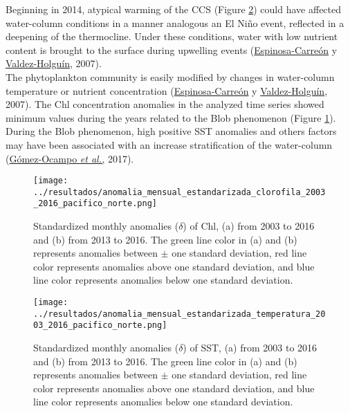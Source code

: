 \documentclass{article} %
\begin{document}
Beginning in 2014, atypical warming of the CCS (Figure \ref{fig:anomalies_sst}) could have affected water-column conditions in a manner analogous an El Niño event, reflected in a deepening of the thermocline. Under these conditions, water with low nutrient content is brought to the surface during upwelling events (\hyperlink{espinosa}{Espinosa-Carreón} y \hyperlink{espinosa}{Valdez-Holguín}, 2007).\\

The phytoplankton community is easily modified by changes in water-column temperature or nutrient concentration (\hyperlink{espinosa}{Espinosa-Carreón} y \hyperlink{espinosa}{Valdez-Holguín}, 2007). The Chl concentration anomalies in the analyzed time series showed minimum values during the years related to the Blob phenomenon (Figure \ref{fig:anomalies_chl}). During the Blob phenomenon, high positive SST anomalies and others factors may have been associated with an increase stratification of the water-column (\hyperlink{gomez}{Gómez-Ocampo \textit{et al.,}} 2017).\\

\begin{figure}
  \begin{center}
  \texttt{[image: ../resultados/anomalia\_mensual\_estandarizada\_clorofila\_2003\_2016\_pacifico\_norte.png]}
  \caption{Standardized monthly anomalies ($\delta$) of Chl, (a) from 2003 to 2016 and (b) from 2013 to 2016. The green line color in (a) and (b) represents anomalies between $\pm$ one standard deviation, red line color represents anomalies above one standard deviation, and blue line color represents anomalies below one standard deviation.}
  \label{fig:anomalies_chl}
  \end{center}
\end{figure}


\begin{figure}
  \begin{center}
  \texttt{[image: ../resultados/anomalia\_mensual\_estandarizada\_temperatura\_2003\_2016\_pacifico\_norte.png]}
  \caption{ Standardized monthly anomalies ($\delta$) of SST, (a) from 2003 to 2016 and (b) from 2013 to 2016. The green line color in (a) and (b) represents anomalies between $\pm$ one standard deviation, red line color represents anomalies above one standard deviation, and blue line color represents anomalies below one standard deviation.}
  \label{fig:anomalies_sst}
  \end{center}
\end{figure}
\end{document}
